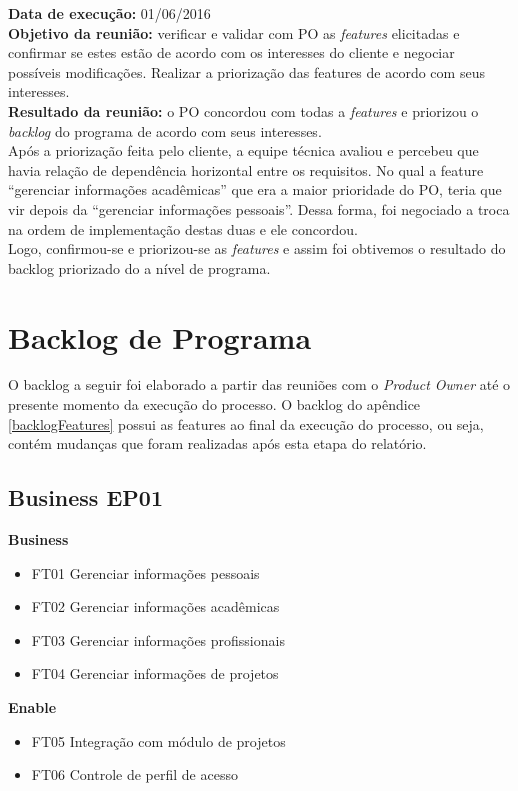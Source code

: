     \indent \textbf{Data de execução:} 01/06/2016\\
    \indent \textbf{Objetivo da reunião:} verificar e validar com PO as \textit{features} elicitadas e confirmar se estes estão de acordo com os interesses do cliente e negociar possíveis modificações. Realizar a priorização das features de acordo com seus interesses.\\
    \indent \textbf{Resultado da reunião:} o PO concordou com todas a \textit{features} e priorizou o \textit{backlog} do programa de acordo com seus interesses.\\

Após a priorização feita pelo cliente, a equipe técnica avaliou e percebeu que havia relação de dependência horizontal entre os requisitos. No qual a feature “gerenciar informações acadêmicas” que era a maior prioridade do PO, teria que vir depois da “gerenciar informações pessoais”. Dessa forma, foi negociado a troca na ordem de implementação destas duas e ele concordou.\\

Logo, confirmou-se e priorizou-se as \textit{features} e assim foi obtivemos o resultado do backlog priorizado do a nível de programa.\\

\section{Backlog de Programa}

O backlog a seguir foi elaborado a partir das reuniões com o \textit{Product Owner} até o presente momento da execução do processo. O backlog do apêndice \ref{backlogFeatures} possui as features ao final da execução do processo, ou seja, contém mudanças que foram realizadas após esta etapa do relatório.

\subsection{Business EP01}
\textbf{Business}
\begin{itemize}
    \item FT01 Gerenciar informações pessoais
    \item FT02 Gerenciar informações acadêmicas
    \item FT03 Gerenciar informações profissionais
    \item FT04 Gerenciar informações de projetos
\end{itemize}
\textbf{Enable}
\begin{itemize}
    \item FT05 Integração com módulo de projetos
    \item FT06 Controle de perfil de acesso
\end{itemize}
